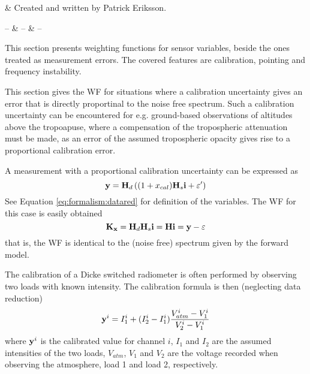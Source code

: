 %
%
 \label{sec:wfuns_sens}


%
%
 & Created and written by Patrick Eriksson.\\
\stophistory


%
%
%
\startsymbols
  -- & -- & -- \\
 \label{symtable:wfuns_sens}     
\stopsymbols



%
%
This section presents weighting functions for sensor variables, beside the
ones treated as measurement errors. The covered features are calibration,
pointing and frequency instability.




 \label{sec:wfuns_sens:cal}
 
 This section gives the WF for situations where a calibration
 uncertainty gives an error that is directly proportinal to the noise
 free spectrum.  Such a calibration uncertainty can be encountered for
 e.g. ground-based observations of altitudes above the tropoapuse,
 where a compensation of the tropospheric attenuation must be made, as an
 error of the assumed tropospheric opacity gives rise to a proportional 
 calibration error.

 A measurement with a proportional calibration uncertainty
 can be expressed as
 \begin{equation}
   \mathbf{y} = \mathbf{H}_d\left( (1+x_{cal})\mathbf{H}_s\mathbf{i}+\varepsilon' \right)
 \end{equation}
 See Equation \ref{eq:formalism:datared} for definition of the variables.
 The WF for this case is easily obtained
 \begin{equation}
   \mathbf{K}_{\mathbf{x}} = \mathbf{H}_d\mathbf{H}_s\mathbf{i} = \mathbf{H}\mathbf{i} = \mathbf{y} - \varepsilon
 \end{equation}
 that is, the WF is identical to the (noise free) spectrum given by the forward
 model. 

 
 The calibration of a Dicke switched radiometer is often performed by
 observing two loads with known intensity. The calibration formula is
 then (neglecting data reduction)
 \begin{equation}
   \mathbf{y}^i =  I_1^i + (I_2^i-I_1^i)\frac{V_{atm}^i-V_1^i}{V_2^i-V_1^i} 
  \label{sec:wfuns_sens:loadcal}
 \end{equation}
 where $\mathbf{y}^i$ is the calibrated value for channel $i$, $I_1$ and $I_2$
 are the assumed intensities of the two loads, $V_{atm}$, $V_1$ and
 $V_2$ are the voltage recorded when observing the atmosphere, load 1
 and load 2, respectively.
 
